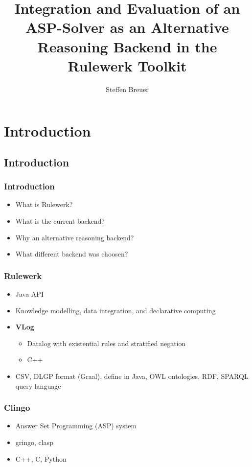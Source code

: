 \documentclass{beamer}
\title{Integration and Evaluation of an ASP-Solver as an Alternative
Reasoning Backend in the Rulewerk Toolkit}
\author{Steffen Breuer}
\institute[Knowledge Based Systems]{TU Dresden}
\begin{document}
\maketitle


\section{Introduction}
\subsection{Introduction}
\begin{frame}
\frametitle{Introduction}
\begin{itemize}
\item What is Rulewerk?
\item What is the current backend?
\item Why an alternative reasoning backend?
\item What different backend was choosen?

\end{itemize}
\end{frame}

\begin{frame}
\frametitle{Rulewerk}
\begin{itemize}
\item Java API
\item Knowledge modelling, data integration, and declarative computing
\item \textbf{VLog}
\begin{itemize}
\item Datalog with existential rules and stratified negation
\item C++
\end{itemize}
\item CSV, DLGP format (Graal), define in Java, OWL ontologies, RDF, SPARQL query language
\end{itemize}
\end{frame}

\begin{frame}
\frametitle{Clingo}
\begin{itemize}
\item Answer Set Programming (ASP) system
\item gringo, clasp
\item C++, C, Python
\end{itemize}

\end{frame}
\end{document}

